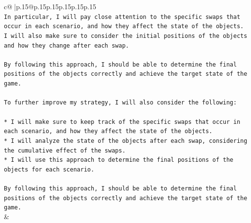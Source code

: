 \documentclass{article}
\begin{document}
{\begin{supertabular}{c@{$\;$}|p{.15\linewidth}@{}p{.15\linewidth}p{.15\linewidth}p{.15\linewidth}p{.15\linewidth}p{.15\linewidth}}
{{{\\ 
\texttt{In particular, I will pay close attention to the specific swaps that occur in each scenario, and how they affect the state of the objects. I will also make sure to consider the initial positions of the objects and how they change after each swap.} \\
\\ 
\texttt{By following this approach, I should be able to determine the final positions of the objects correctly and achieve the target state of the game.} \\
\\ 
\texttt{To further improve my strategy, I will also consider the following:} \\
\\ 
\texttt{* I will make sure to keep track of the specific swaps that occur in each scenario, and how they affect the state of the objects.} \\
\texttt{* I will analyze the state of the objects after each swap, considering the cumulative effect of the swaps.} \\
\texttt{* I will use this approach to determine the final positions of the objects for each scenario.} \\
\\ 
\texttt{By following this approach, I should be able to determine the final positions of the objects correctly and achieve the target state of the game.} \\
            }
        }
    }
    & \\ \\

\end{supertabular}
}
\end{document}
